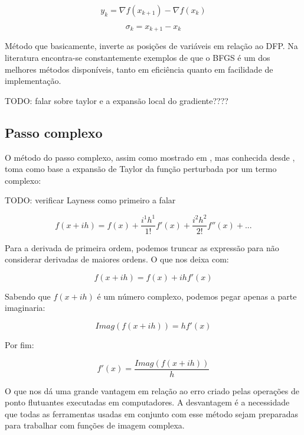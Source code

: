 \begin{equation*}
y_k = \nabla f(x_{k+1}) - \nabla f(x_k)
\end{equation*}

\begin{equation*}
\sigma_k = x_{k+1} - x_k
\end{equation*}


Método que basicamente, inverte as posições de variáveis em relação ao DFP.
Na literatura encontra-se constantemente exemplos de que o BFGS é um dos melhores
métodos disponíveis, tanto em eficiência quanto em facilidade de implementação.



TODO: falar sobre taylor e a expansão local do gradiente????


\subsection{Passo complexo}
O método do passo complexo, assim como mostrado em \cite{Lai_2005}, mas conhecida desde
\cite{Lyness_1967}, toma como base a expansão de Taylor da função perturbada por um termo
complexo:

TODO: verificar Layness como primeiro a falar

\begin{equation*}
f(x + ih) = f(x) + \frac{i^1h^1}{1!}f'(x) + \frac{i^2h^2}{2!} f''(x) + ...
\end{equation*}

Para a derivada de primeira ordem, podemos truncar as expressão para não considerar derivadas
de maiores ordens. O que nos deixa com:


\begin{equation*}
f(x + ih) = f(x) + ihf'(x)
\end{equation*}

Sabendo que \(f(x+ih)\) é um número complexo, podemos pegar apenas a parte imaginaria:

\begin{equation*}
Imag(f(x + ih)) = hf'(x)
\end{equation*}

Por fim:

\begin{equation*}
f'(x) = \frac{Imag(f(x + ih))}{h}
\end{equation*}


O que nos dá uma grande vantagem em relação ao erro criado pelas operações de ponto flutuantes
executadas em computadores. A desvantagem é a necessidade que todas as ferramentas usadas em
conjunto com esse método sejam preparadas para trabalhar com funções de imagem complexa.

